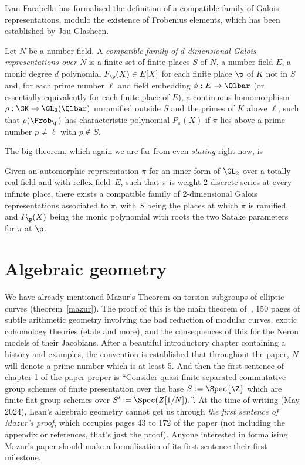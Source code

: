 Ivan Farabella has formalised the definition of a compatible family of Galois
representations, modulo the existence of Frobenius elements, which has been
established by Jou Glasheen.

\begin{definition}\label{compatible_family} Let $N$ be a number field. A \emph{compatible family of $d$-dimensional Galois representations over $N$} is a finite set of finite places $S$ of $N$,
a number field $E$, a monic degree $d$ polynomial $F_{\p}(X)\in E[X]$ for each finite place $\p$ of $K$ not in $S$ and, for each prime number $\ell$ and field embedding $\phi : E\to\Qlbar$ (or essentially equivalently for each finite place of $E$), a continuous homomorphism $\rho:\GK\to\GL_2(\Qlbar)$ unramified outside $S$ and the primes of $K$ above $\ell$, such that $\rho(\Frob_\p)$ has characteristic polynomial $P_\pi(X)$ if $\pi$ lies above a prime number $p\not=\ell$ with $p\not\in S$.
\end{definition}

The big theorem, which again we are far from even \emph{stating} right now, is

\begin{theorem}\label{Galois_representation_from_automorphic_representation_on_GL_2_form}\notready Given an automorphic representation $\pi$ for an inner form of $\GL_2$ over a totally real field and with reflex field~$E$, such that $\pi$ is weight 2 discrete series at every infinite place, there exists a compatible family of 2-dimensional Galois representations associated to $\pi$, with $S$ being the places at which $\pi$ is ramified, and $F_{\p}(X)$ being the monic polynomial with roots the two Satake parameters for $\pi$ at $\p$.
\end{theorem}

\section{Algebraic geometry}

We have already mentioned Mazur's Theorem on torsion subgroups of elliptic curves (theorem~\ref{mazur}).
The proof of this is the main theorem of~\cite{mazur-torsion}, 150 pages of subtle arithmetic
geometry involving the bad reduction of modular curves, exotic cohomology theories (etale and more),
and the consequences of this for the Neron models of their Jacobians. After a beautiful
introductory chapter containing a history and examples, the convention is established that
throughout the paper, $N$ will denote a prime number which is at least 5. And then the first
sentence of chapter 1 of the paper proper is ``Consider quasi-finite separated commutative group
schemes of finite presentation over the base $S:=\Spec{\Z}$ which are finite flat group schemes
over $S':=\Spec(Z[1/N]).$''. At the time of writing (May 2024), Lean's algebraic geometry cannot
get us through \emph{the first sentence of Mazur's proof}, which occupies pages 43 to 172 of
the paper (not including the appendix or references, that's just the proof). Anyone interested
in formalising Mazur's paper should make a formalisation of its first sentence their first
milestone.

